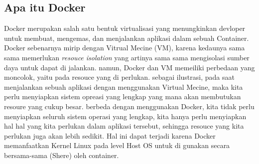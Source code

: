 \documentclass[11pt,a4paper]{article}
\begin{document}
\subsection{Apa itu Docker}
Docker merupakan salah satu bentuk virtualisasi yang menungkinkan devloper untuk membuat, 
mengemas, dan menjalankan aplikasi dalam sebuah Container. Docker sebenarnya mirip dengan 
Vitrual Mecine (VM), karena kedaunya sama sama memerlukan \textit{resouce isolation} yang artinya
sama sama mengisolasi sumber daya untuk dapat di jalankan. namun, Docker dan VM memeiliki
perbedaan yang moncolok, yaitu pada resouce yang di perlukan. sebagai ilustrasi, pada saat 
menjalankan sebuah aplikasi dengan menggunakan Virtual Mecine, maka kita perlu menyiapkan 
sistem opreasi yang lengkap yang mana akan membutukan resoure yang cukup besar. berbeda dengan
menggunakan Docker, kita tidak perlu menyiapkan seluruh sistem operasi yang lengkap, kita hanya
perlu menyiapkan hal hal yang kita perlukan dalam aplikasi tersebut, sehingga resouce yang kita 
perlukan juga akan lebih sedikit. Hal ini dapat terjadi karena Docker memanfaatkan Kernel Linux
pada level Host OS untuk di gunakan secara bersama-sama (Shere) oleh container.
\end{document}
